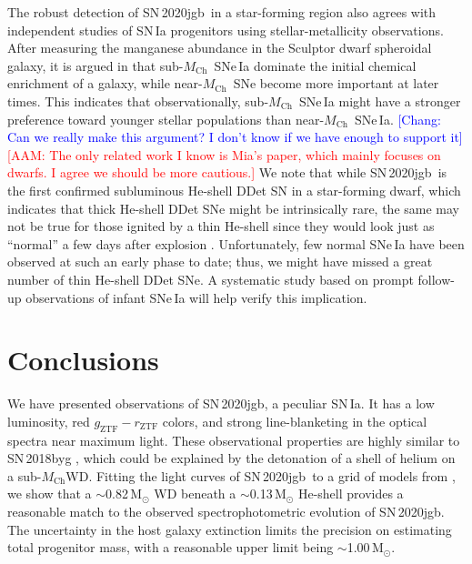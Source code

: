 \documentclass[twocolumn]{aastex631}
\newcommand{\sn}{SN\,2020jgb}
\newcommand{\Mch}{$M_\mathrm{Ch}$}
\newcommand{\Msun}{\mathrm{M_\odot}}
\newcommand{\adam}[1]{\textcolor{red}{[AAM: #1]}}
\newcommand{\chang}[1]{\textcolor{blue}{[Chang: #1]}}
\begin{document}
The robust detection of \sn\ in a star-forming region also agrees with independent studies of SN\,Ia progenitors using stellar-metallicity observations. After measuring the manganese abundance in the Sculptor dwarf spheroidal galaxy, it is argued in \citet{de_los_reyes_manganese_2020} that sub-\Mch\ SNe\,Ia dominate the initial chemical enrichment of a galaxy, while near-\Mch\ SNe become more important at later times. This indicates that observationally, sub-\Mch\ SNe\,Ia might have a stronger preference toward younger stellar populations than near-\Mch\ SNe\,Ia. %
\chang{Can we really make this argument? I don't know if we have enough to support it} \adam{The only related work I know is Mia's paper, which mainly focuses on dwarfs. I agree we should be more cautious.}
We note that while \sn\ is the first confirmed subluminous He-shell DDet SN in a star-forming dwarf, which indicates that thick He-shell DDet SNe might be intrinsically rare, the same may not be true for those ignited by a thin He-shell since they would look just as  ``normal'' a few days after explosion \citep{Magee_2021}. Unfortunately, few normal SNe\,Ia have been observed at such an early phase to date; thus, we might have missed a great number of thin He-shell DDet SNe. A systematic study based on prompt follow-up observations of infant SNe\,Ia will help verify this implication.

\section{Conclusions} \label{sec:conclusion}
We have presented observations of \sn, a peculiar SN\,Ia. It has a low luminosity, red $g_\mathrm{ZTF}-r_\mathrm{ZTF}$ colors, and strong line-blanketing in the optical spectra near maximum light. These observational properties are highly similar to SN\,2018byg \citep{de_18byg_2019}, which could be explained by the detonation of a shell of helium on a sub-\Mch WD. Fitting the light curves of \sn\ to a grid of models from \citet{polin_observational_2019}, we show that a $\sim$0.82\,$\Msun$ WD beneath a $\sim$0.13\,$\Msun$ He-shell provides a reasonable match to the observed spectrophotometric evolution of \sn. The uncertainty in the host galaxy extinction limits the precision on estimating total progenitor mass, with a reasonable upper limit being $\sim$1.00\,$\Msun$.
\end{document}
